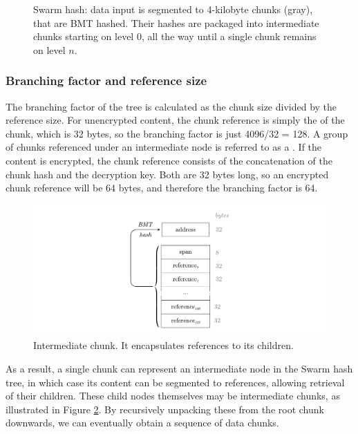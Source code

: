 \begin{figure}[htbp]
\centering
\resizebox{1\textwidth}{!}{
    
}
\caption[Swarm hash \statusgreen]{Swarm hash: data input is segmented to 4-kilobyte chunks (gray), that are BMT hashed. Their hashes are packaged into intermediate chunks starting on level $0$, all the way until a single chunk remains on level $n$. }
\label{fig:Swarm-hash}
\end{figure}

\subsubsection{Branching factor and reference size}

The branching factor of the tree is calculated as the chunk size divided by the reference size. For unencrypted content, the chunk reference is simply the  of the chunk, which is 32 bytes, so the branching factor is just 4096/32 =  128. A group of chunks referenced under an intermediate node is referred to as a . If the content is encrypted, the chunk reference consists of the concatenation of the chunk hash and the decryption key. Both are 32 bytes long, so an encrypted chunk reference will be 64 bytes, and therefore the branching factor is 64. 


\begin{figure}[htbp]
\centering
\includegraphics[width=\textwidth]{fig/intermediate-chunk-3.pdf}
\caption[Intermediate chunk \statusgreen]{Intermediate chunk. It encapsulates references to its children.}
\label{fig:intermediate-chunk}
\end{figure}

As a result, a single chunk can represent an intermediate node in the Swarm hash tree, in which case its content can be segmented to references, allowing retrieval of their children. These child nodes themselves may be intermediate chunks, as illustrated in Figure \ref{fig:intermediate-chunk}. By recursively unpacking these from the root chunk downwards, we can eventually obtain a sequence of data chunks. 

